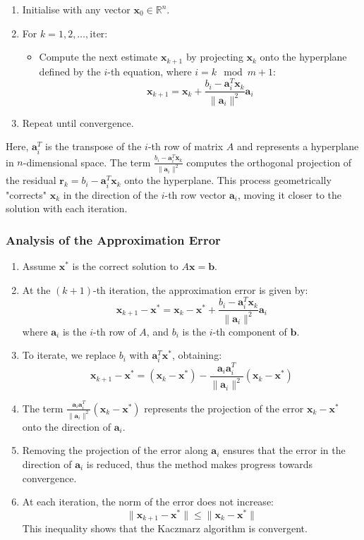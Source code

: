 \begin{enumerate}
    \item Initialise with any vector \( \mathbf{x}_0 \in \mathbb{R}^n \).
    \item For \( k = 1, 2, \dots, \text{iter} \):
    \begin{itemize}
        \item Compute the next estimate \( \mathbf{x}_{k+1} \) by projecting \( \mathbf{x}_k \) onto the hyperplane defined by the \( i \)-th equation, where \( i = k \mod m + 1 \):
        \[ \mathbf{x}_{k+1} = \mathbf{x}_k + \frac{b_i - \mathbf{a}_i^T \mathbf{x}_k}{\|\mathbf{a}_i\|^2} \mathbf{a}_i \]
    \end{itemize}
    \item Repeat until convergence.
\end{enumerate}

Here, \( \mathbf{a}_i^T \) is the transpose of the \( i \)-th row of matrix \( A \) and represents a hyperplane in \( n \)-dimensional space. The term \( \frac{b_i - \mathbf{a}_i^T \mathbf{x}_k}{\|\mathbf{a}_i\|^2} \) computes the orthogonal projection of the residual \( \mathbf{r}_k = b_i - \mathbf{a}_i^T \mathbf{x}_k \) onto the hyperplane. This process geometrically "corrects" \( \mathbf{x}_k \) in the direction of the \( i \)-th row vector \( \mathbf{a}_i \), moving it closer to the solution with each iteration.
\subsubsection*{Analysis of the Approximation Error}
\begin{enumerate}
    \item Assume \( \bm{x}^* \) is the correct solution to \( A\bm{x} = \bm{b} \).
    \item At the \( (k+1) \)-th iteration, the approximation error is given by:
    \[ \bm{x}_{k+1} - \bm{x}^* = \bm{x}_k - \bm{x}^* + \frac{b_i - \bm{a}_i^T \bm{x}_k}{\| \bm{a}_i \|^2} \bm{a}_i \]
    where \( \bm{a}_i \) is the \( i \)-th row of \( A \), and \( b_i \) is the \( i \)-th component of \( \bm{b} \).
    \item To iterate, we replace \( b_i \) with \( \bm{a}_i^T \bm{x}^* \), obtaining:
    \[ \bm{x}_{k+1} - \bm{x}^* = \left( \bm{x}_k - \bm{x}^* \right) - \frac{\bm{a}_i \bm{a}_i^T}{\| \bm{a}_i \|^2} \left( \bm{x}_k - \bm{x}^* \right) \]
    \item The term \( \frac{\bm{a}_i \bm{a}_i^T}{\| \bm{a}_i \|^2} \left( \bm{x}_k - \bm{x}^* \right) \) represents the projection of the error \( \bm{x}_k - \bm{x}^* \) onto the direction of \( \bm{a}_i \).
    \item Removing the projection of the error along \( \bm{a}_i \) ensures that the error in the direction of \( \bm{a}_i \) is reduced, thus the method makes progress towards convergence.
    \item At each iteration, the norm of the error does not increase:
    \[ \| \bm{x}_{k+1} - \bm{x}^* \| \leq \| \bm{x}_k - \bm{x}^* \| \]
    This inequality shows that the Kaczmarz algorithm is convergent.
\end{enumerate}

